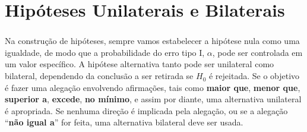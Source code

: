 \documentclass[14pt,aspectratio=1610]{beamer}
\newcommand{\Ho}{\ensuremath{H_{0}}}
\newcommand{\Hi}{\ensuremath{H_{1}}}
\begin{document}
%
%
%
%

\section{Hipóteses Unilaterais e Bilaterais}
\begin{frame}{}
\frametitle{}
\begin{block}{}
\justifying
Na construção de hipóteses, sempre vamos estabelecer a hipótese nula como uma igualdade, de modo que a probabilidade do erro tipo I, $\alpha$, pode ser controlada em 
um valor específico. A hipótese alternativa tanto pode ser unilateral como bilateral, dependendo da conclusão a ser retirada se $\Ho$ é rejeitada. Se o objetivo é fazer uma 
alegação envolvendo afirmações, tais como \textbf{maior que}, \textbf{menor que}, \textbf{superior a},\textbf{ excede}, \textbf{no mínimo}, e assim por diante, uma alternativa 
unilateral é apropriada. Se nenhuma direção é implicada pela alegação, ou se a alegação ``\textbf{não igual a}'' for feita, uma alternativa bilateral deve ser usada.

\end{block}
\end{frame}
\end{document}
